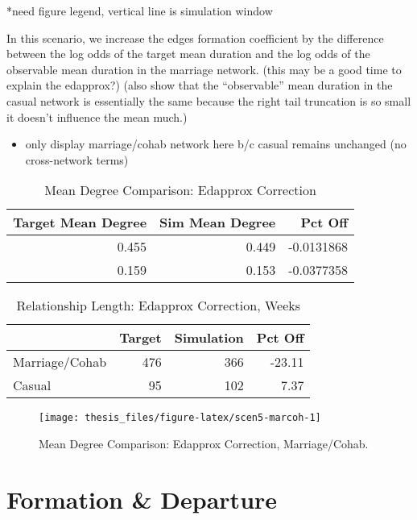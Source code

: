 \documentclass [11pt, proquest] {uwthesis}[2015/03/03]
\providecommand{\tightlist}{%
  \setlength{\itemsep}{0pt}\setlength{\parskip}{0pt}}
\begin{document}
*need figure legend, vertical line is simulation window

In this scenario, we increase the edges formation coefficient by the
difference between the log odds of the target mean duration and the log
odds of the observable mean duration in the marriage network. (this may
be a good time to explain the edapprox?) (also show that the
``observable'' mean duration in the casual network is essentially the
same because the right tail truncation is so small it doesn't influence
the mean much.)
\begin{itemize}
\tightlist
\item
  only display marriage/cohab network here b/c casual remains unchanged
  (no cross-network terms)
\end{itemize}
\begin{table}

\caption{\label{tab:scen5-tab}Mean Degree Comparison: Edapprox Correction}
\centering
\begin{tabular}[t]{rrr}
\toprule
Target Mean Degree & Sim Mean Degree & Pct Off\\
\midrule
0.455 & 0.449 & -0.0131868\\
0.159 & 0.153 & -0.0377358\\
\bottomrule
\end{tabular}
\end{table}
\begin{table}

\caption{\label{tab:scen5-duration}Relationship Length: Edapprox Correction, Weeks}
\centering
\begin{tabular}[t]{lrrr}
\toprule
  & Target & Simulation & Pct Off\\
\midrule
Marriage/Cohab & 476 & 366 & -23.11\\
Casual & 95 & 102 & 7.37\\
\bottomrule
\end{tabular}
\end{table}
\begin{figure}

{\centering \texttt{[image: thesis\_files/figure-latex/scen5-marcoh-1]} 

}

\caption{Mean Degree Comparison: Edapprox Correction, Marriage/Cohab.}\label{fig:scen5-marcoh}
\end{figure}
\section{Formation \& Departure}\label{formation-departure}
\end{document}
